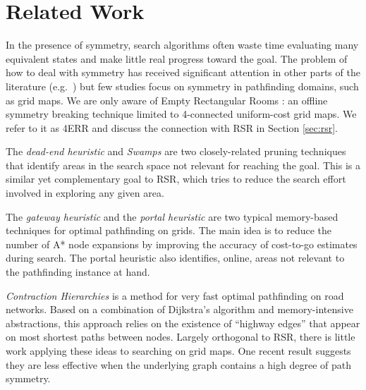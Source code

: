 \section{Related Work}
\label{sec:relatedwork}
In the presence of symmetry, search algorithms often
waste time evaluating many equivalent states and make little real progress toward the goal.
The problem of how to deal with symmetry has received significant attention
in other parts of the literature (e.g.~\cite{rossi06}) but few studies
focus on symmetry in pathfinding domains, such as grid maps.
We are only aware of Empty Rectangular Rooms \cite{harabor10}: an offline symmetry 
breaking technique limited to 4-connected uniform-cost grid maps. We refer to
it as 4ERR and discuss the connection with RSR in Section \ref{sec:rsr}.
\par
The \emph{dead-end heuristic} \cite{bjornsson06} and \emph{Swamps} \cite{pochter10} 
are two closely-related pruning techniques
that identify areas in the search space not relevant for reaching the goal. 
This is a similar yet complementary goal
to RSR, which tries to reduce the search effort involved in exploring any given
area. 
\par
The \emph{gateway heuristic} \cite{bjornsson06} and the \emph{portal heuristic}
\cite{goldenberg10} are two typical memory-based techniques for optimal 
pathfinding on grids. 
The main idea is to reduce the number of
A* node expansions by improving the accuracy of cost-to-go estimates during
search.  The portal heuristic also identifies, online, areas
not relevant to the pathfinding instance at hand.
\par
\emph{Contraction Hierarchies} \cite{geisberger08} is a method for
very fast optimal pathfinding on road networks. 
Based on a combination of Dijkstra's algorithm and memory-intensive
abstractions, this approach relies on the existence of ``highway edges'' that appear
on most shortest paths between nodes.
Largely orthogonal to RSR, there is little work applying these ideas to searching on grid maps.
One recent result \cite{sturtevant10} suggests they are less effective when the 
underlying graph contains a high degree of path
symmetry.
